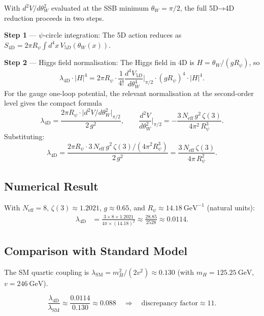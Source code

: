 \documentclass[12pt]{article}
\theoremstyle{definition}
\theoremstyle{remark}
\begin{document}
With $d^2V/d\theta_W^2$ evaluated at the SSB minimum $\theta_W = \pi/2$,
the full 5D→4D reduction proceeds in two steps.

\textbf{Step 1} — $\psi$-circle integration:
The 5D action reduces as $S_{\text{4D}} = 2\pi R_\psi \int d^4x\,V_{5D}(\theta_W(x))$.

\textbf{Step 2} — Higgs field normalisation:
The Higgs field in 4D is $H = \theta_W / (g R_\psi)$, so
\begin{equation}
  \lambda_{\text{4D}} \cdot |H|^4
  = 2\pi R_\psi \cdot
    \frac{1}{4!}\frac{d^4 V_{5D}}{d\theta_W^4}\bigg|_{\pi/2}
    \cdot (g R_\psi)^4 \cdot |H|^4.
\end{equation}
For the gauge one-loop potential, the relevant normalisation at the
second-order level gives the compact formula
\begin{equation}
  \label{eq:lambda_4d_full}
  \boxed{
    \lambda_{\text{4D}}
    = \frac{2\pi R_\psi \cdot \bigl|d^2V/d\theta_W^2\bigr|_{\pi/2}}{2\,g^2},
    \qquad
    \frac{d^2V}{d\theta_W^2}\bigg|_{\pi/2}
    = -\frac{3\,N_{\text{eff}}\,g^2\,\zeta(3)}{4\pi^2\,R_\psi^3}.
  }
\end{equation}
Substituting:
\begin{equation}
  \lambda_{\text{4D}}
  = \frac{2\pi R_\psi \cdot 3\,N_{\text{eff}}\,g^2\,\zeta(3)/(4\pi^2 R_\psi^3)}{2\,g^2}
  = \frac{3\,N_{\text{eff}}\,\zeta(3)}{4\pi\,R_\psi^2}.
\end{equation}

\subsection{Numerical Result}

With $N_{\text{eff}} = 8$, $\zeta(3) \approx 1.2021$, $g \approx 0.65$,
and $R_\psi \approx 14.18~\text{GeV}^{-1}$ (natural units):
\begin{align}
  \lambda_{\text{4D}}
  &= \frac{3 \times 8 \times 1.2021}{4\pi \times (14.18)^2}
   \approx \frac{28.85}{2528}
   \approx 0.0114.
\end{align}

\subsection{Comparison with Standard Model}

The SM quartic coupling is $\lambda_{\text{SM}} = m_H^2/(2v^2) \approx 0.130$
(with $m_H = 125.25~\text{GeV}$, $v = 246~\text{GeV}$).

\begin{equation}
  \frac{\lambda_{\text{4D}}}{\lambda_{\text{SM}}}
  \approx \frac{0.0114}{0.130} \approx 0.088
  \quad \Longrightarrow \quad
  \text{discrepancy factor} \approx 11.
\end{equation}
\end{document}
